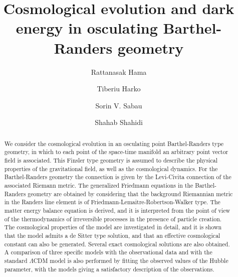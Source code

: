 \documentclass[aps,superscriptaddress, showpacs,preprintnumbers, superscriptaddress, nofootinbibt,twocolumn]{revtex4-2}
\begin{document}
\title{Cosmological evolution and dark energy in osculating Barthel-Randers geometry}
\author{Rattanasak Hama}
\author{Tiberiu Harko}
\author{Sorin V. Sabau}
\author{Shahab Shahidi}

\begin{abstract}
We consider the cosmological evolution in an osculating point Barthel-Randers type geometry, in which to each point of the
space-time manifold an arbitrary point vector field is associated. This Finsler type geometry is assumed to describe the physical
properties of the gravitational field, as well as the cosmological dynamics. For the Barthel-Randers geometry the connection is given by the Levi-Civita connection of the associated Riemann metric. The generalized Friedmann equations in the Barthel-Randers geometry are obtained by considering that the background Riemannian metric in the Randers line element is of Friedmann-Lemaitre-Robertson-Walker type. The matter energy balance equation is derived, and it is interpreted from the point of view of the thermodynamics of irreversible processes in the presence of particle creation. The cosmological properties of the model are investigated in detail, and it is shown that the model admits a de Sitter type solution, and that an effective cosmological constant can also be generated. Several exact cosmological solutions are also obtained. A comparison of three specific models with the observational data and with the standard $\Lambda$CDM model  is also performed by fitting the observed values of the Hubble parameter, with the models giving a satisfactory description of the observations.
\end{abstract}
\end{document}
